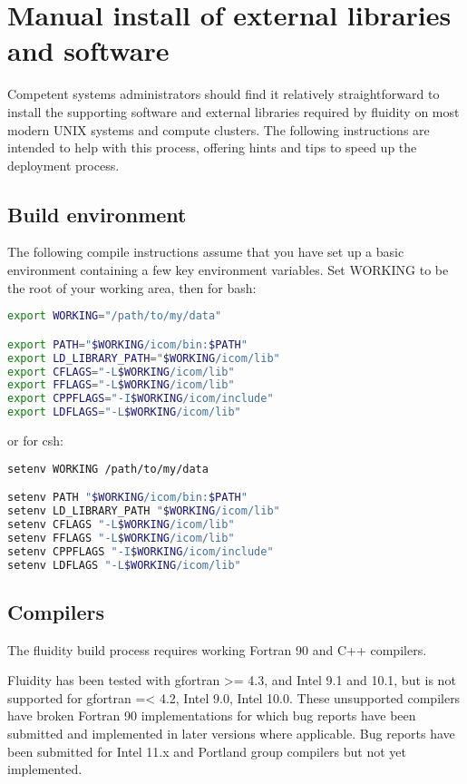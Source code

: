 \section{Manual install of external libraries and software}
\label{sect:required_ḻibraries_manual_install}

Competent systems administrators should find it relatively straightforward to
install the supporting software and external libraries required by fluidity on
most modern UNIX systems and compute clusters. The following instructions are
intended to help with this process, offering hints and tips to speed up the
deployment process.

\subsection{Build environment}
\label{sect:required_libraries_build_environment}

The following compile instructions assume that you have set up a basic
environment containing a few key environment variables. Set WORKING to be the
root of your working area, then for bash:

\begin{lstlisting}[language=bash]
export WORKING="/path/to/my/data"

export PATH="$WORKING/icom/bin:$PATH"
export LD_LIBRARY_PATH="$WORKING/icom/lib"
export CFLAGS="-L$WORKING/icom/lib"
export FFLAGS="-L$WORKING/icom/lib"
export CPPFLAGS="-I$WORKING/icom/include"
export LDFLAGS="-L$WORKING/icom/lib"
\end{lstlisting}

or for csh:

\begin{lstlisting}[language=bash]
setenv WORKING /path/to/my/data

setenv PATH "$WORKING/icom/bin:$PATH"
setenv LD_LIBRARY_PATH "$WORKING/icom/lib"
setenv CFLAGS "-L$WORKING/icom/lib"
setenv FFLAGS "-L$WORKING/icom/lib"
setenv CPPFLAGS "-I$WORKING/icom/include"
setenv LDFLAGS "-L$WORKING/icom/lib"
\end{lstlisting}

\subsection{Compilers}
\label{sect:required_libraries_compilers}

The fluidity build process requires working Fortran 90 and C++ compilers.

Fluidity has been tested with gfortran >= 4.3, and Intel 9.1 and 10.1, but is
not supported for gfortran =< 4.2, Intel 9.0, Intel 10.0. These unsupported
compilers have broken Fortran 90 implementations for which bug reports have
been submitted and implemented in later versions where applicable. Bug reports
have been submitted for Intel 11.x and Portland group compilers but not yet
implemented.

